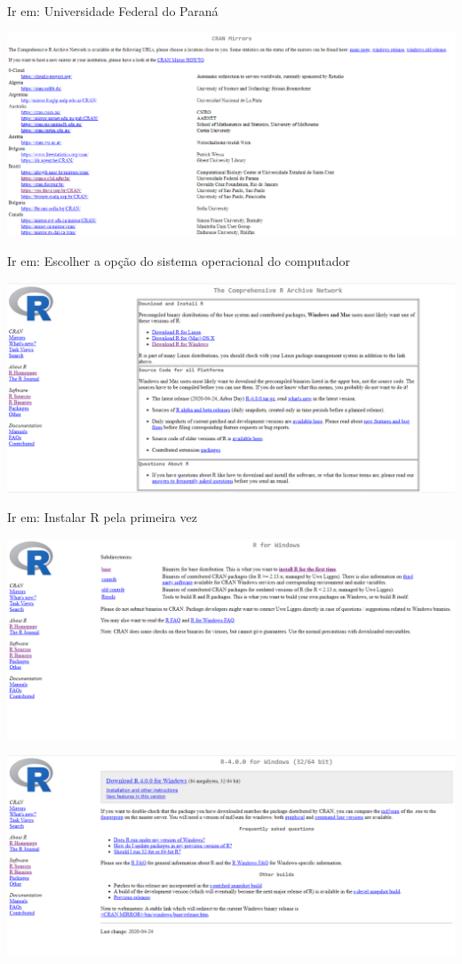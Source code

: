 \documentclass[
]{book}
\begin{document}
Ir em: Universidade Federal do Paraná

\includegraphics{install2.png}

Ir em: Escolher a opção do sistema operacional do computador

\includegraphics{install3.png}

Ir em: Instalar R pela primeira vez

\includegraphics{install4.png}

\includegraphics{install5.png}
\end{document}
